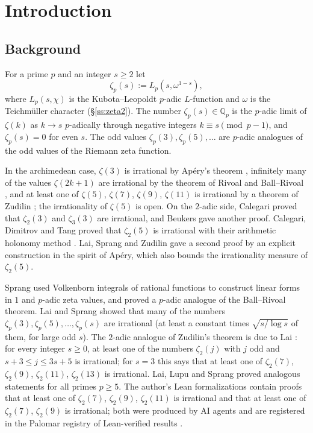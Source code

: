 \documentclass{amsart}
\theoremstyle{definition}
\theoremstyle{remark}
\numberwithin{equation}{section}
\newcommand{\Q}{\mathbb{Q}}
\begin{document}
\maketitle

\tableofcontents

\section{Introduction}\label{sec:intro}

\subsection{Background}\label{ss:background}

For a prime $p$ and an integer $s\ge2$ let
\[
  \zeta_p(s):=L_p(s,\omega^{1-s}),
\]
where $L_p(s,\chi)$ is the Kubota--Leopoldt $p$-adic $L$-function and $\omega$
is the Teichm\"uller character (\S\ref{ss:zeta2}). The number
$\zeta_p(s)\in\Q_p$ is the $p$-adic limit of $\zeta(k)$ as $k\to s$
$p$-adically through negative integers $k\equiv s\pmod{p-1}$, and
$\zeta_p(s)=0$ for even $s$. The odd values $\zeta_p(3),\zeta_p(5),\dots$ are
$p$-adic analogues of the odd values of the Riemann zeta function.

In the archimedean case, $\zeta(3)$ is irrational by Ap\'ery's theorem
\cite{Ape79}, infinitely many of the values $\zeta(2k+1)$ are irrational by
the theorem of Rivoal and Ball--Rivoal \cite{Riv00,BR01}, and at least one of
$\zeta(5)$, $\zeta(7)$, $\zeta(9)$, $\zeta(11)$ is irrational by a theorem of
Zudilin \cite{Zud01}; the irrationality of $\zeta(5)$ is open. On the $2$-adic
side, Calegari \cite{Cal05} proved that $\zeta_2(3)$ and $\zeta_3(3)$ are
irrational, and Beukers \cite{Beu08} gave another proof. Calegari, Dimitrov
and Tang proved that $\zeta_2(5)$ is irrational with their arithmetic
holonomy method \cite{CDT20,CDT25}. Lai, Sprang and Zudilin \cite{LSZ26} gave a
second proof by an explicit construction in the spirit of Ap\'ery, which also
bounds the irrationality measure of $\zeta_2(5)$.

Sprang \cite{Spr20} used Volkenborn integrals of rational functions to
construct linear forms in $1$ and $p$-adic zeta values, and proved a $p$-adic
analogue of the Ball--Rivoal theorem. Lai and Sprang \cite{LS25} showed that
many of the numbers $\zeta_p(3),\zeta_p(5),\dots,\zeta_p(s)$ are irrational
(at least a constant times $\sqrt{s/\log s}$ of them, for large odd $s$). The
$2$-adic analogue of Zudilin's theorem is due to Lai \cite[Theorem~1.1]{Lai25}:
for every integer $s\ge0$, at least one of the numbers $\zeta_2(j)$ with $j$
odd and $s+3\le j\le3s+5$ is irrational; for $s=3$ this says that at least
one of $\zeta_2(7)$, $\zeta_2(9)$, $\zeta_2(11)$, $\zeta_2(13)$ is irrational. Lai, Lupu and Sprang
\cite{LLS25} proved analogous statements for all primes $p\ge5$. The author's
Lean formalizations \cite{Dev26,DevPair26} contain proofs that at least one of
$\zeta_2(7)$, $\zeta_2(9)$, $\zeta_2(11)$ is irrational and that at least one
of $\zeta_2(7)$, $\zeta_2(9)$ is irrational; both were produced by AI agents
and are registered in the Palomar registry of Lean-verified results
\cite{Pal26,PalPair26}.
\end{document}
